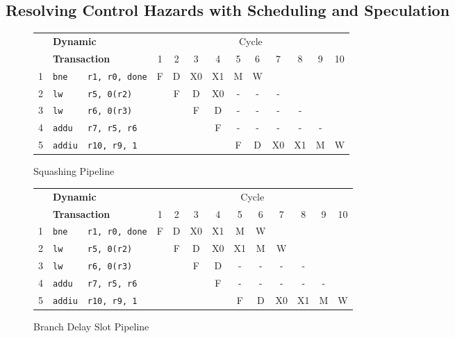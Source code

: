 \documentclass[10pt]{article}
\begin{document}
\subsection{Resolving Control Hazards with Scheduling and Speculation}
\begin{figure}[H]
\centering
\begin{tabular}{cll|c|c|c|c|c|c|c|c|c|c}
\hline
& \multicolumn{2}{l}{\textbf{Dynamic}} & \multicolumn{10}{c}{Cycle} \\
& \multicolumn{2}{l}{\textbf{Transaction}} & 1 & 2 & 3 & 4 & 5 & 6 & 7 & 8 & 9 & 10\\
\hline
1 & \texttt{bne} & \texttt{r1, r0, done} & F & D & X0 & X1 & M & W & & & & \\
\hline
2 & \texttt{lw} & \texttt{r5, 0(r2)} & & F & D & X0 & - & - & - & & & \\
\hline
3 & \texttt{lw} & \texttt{r6, 0(r3)} & & & F & D & - & - & - & - & & \\
\hline
4 & \texttt{addu} & \texttt{r7, r5, r6} & & & & F & - & - & - & - & - & \\
\hline
5 & \texttt{addiu} & \texttt{r10, r9, 1} & & & & & F & D & X0 & X1 & M & W \\
\hline
\end{tabular}
\caption{Squashing Pipeline}
\label{fig:squashing_diagram}
\end{figure}
\begin{figure}[H]
\centering
\begin{tabular}{cll|c|c|c|c|c|c|c|c|c|c}
\hline
& \multicolumn{2}{l}{\textbf{Dynamic}} & \multicolumn{10}{c}{Cycle} \\
& \multicolumn{2}{l}{\textbf{Transaction}} & 1 & 2 & 3 & 4 & 5 & 6 & 7 & 8 & 9 & 10\\
\hline
1 & \texttt{bne} & \texttt{r1, r0, done} & F & D & X0 & X1 & M & W & & & & \\
\hline
2 & \texttt{lw} & \texttt{r5, 0(r2)} & & F & D & X0 & X1 & M & W & & & \\
\hline
3 & \texttt{lw} & \texttt{r6, 0(r3)} & & & F & D & - & - & - & - & & \\
\hline
4 & \texttt{addu} & \texttt{r7, r5, r6} & & & & F & - & - & - & - & - & \\
\hline
5 & \texttt{addiu} & \texttt{r10, r9, 1} & & & & & F & D & X0 & X1 & M & W \\
\hline
\end{tabular}
\caption{Branch Delay Slot Pipeline}
\label{fig:branch_delay_diagram}
\end{figure}
\end{document}
